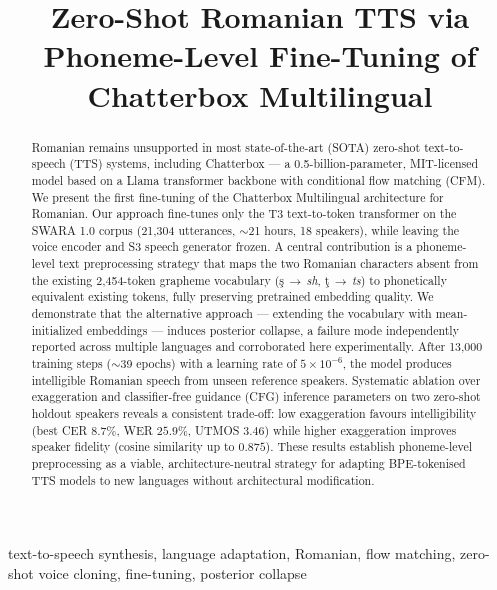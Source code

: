 \documentclass[conference]{IEEEtran}
\begin{document}
\title{Zero-Shot Romanian TTS via Phoneme-Level Fine-Tuning of Chatterbox Multilingual}

\author{
}

\maketitle

\begin{abstract}
Romanian remains unsupported in most state-of-the-art (SOTA)
zero-shot text-to-speech (TTS) systems, including Chatterbox —
a 0.5-billion-parameter, MIT-licensed model based on a Llama
transformer backbone with conditional flow matching (CFM).
We present the first fine-tuning of the Chatterbox Multilingual
architecture for Romanian.
Our approach fine-tunes only the T3 text-to-token transformer on
the SWARA 1.0 corpus (21,304 utterances, $\sim$21 hours, 18 speakers),
while leaving the voice encoder and S3 speech generator frozen.
A central contribution is a phoneme-level text preprocessing
strategy that maps the two Romanian characters absent from the
existing 2,454-token grapheme vocabulary (\c{s}$\,{\to}\,$\textit{sh},
\c{t}$\,{\to}\,$\textit{ts}) to phonetically
equivalent existing tokens, fully preserving pretrained embedding
quality.
We demonstrate that the alternative approach — extending the
vocabulary with mean-initialized embeddings — induces posterior
collapse, a failure mode independently reported across multiple
languages and corroborated here experimentally.
After 13,000 training steps ($\sim$39 epochs) with a learning rate
of $5\times10^{-6}$, the model produces intelligible Romanian speech
from unseen reference speakers.
Systematic ablation over exaggeration and classifier-free guidance
(CFG) inference parameters on two zero-shot holdout speakers reveals
a consistent trade-off: low exaggeration favours intelligibility
(best CER $8.7\%$, WER $25.9\%$, UTMOS $3.46$) while higher
exaggeration improves speaker fidelity (cosine similarity up to
$0.875$).
These results establish phoneme-level preprocessing as a viable,
architecture-neutral strategy for adapting BPE-tokenised TTS models
to new languages without architectural modification.
\end{abstract}

\begin{IEEEkeywords}
text-to-speech synthesis, language adaptation, Romanian,
flow matching, zero-shot voice cloning, fine-tuning,
posterior collapse
\end{IEEEkeywords}
\end{document}
